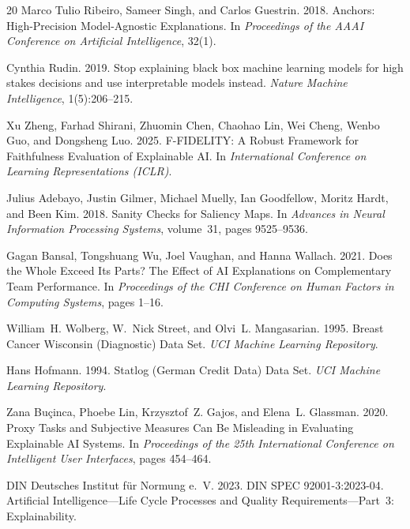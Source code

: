 \documentclass[twoside,11pt]{article}
\begin{document}
\begin{thebibliography}{20}
Marco Tulio Ribeiro, Sameer Singh, and Carlos Guestrin.
2018.
Anchors: High-Precision Model-Agnostic Explanations.
In \emph{Proceedings of the AAAI Conference on Artificial Intelligence}, 32(1).

Cynthia Rudin.
2019.
Stop explaining black box machine learning models for high stakes decisions and use interpretable models instead.
\emph{Nature Machine Intelligence}, 1(5):206--215.

Xu Zheng, Farhad Shirani, Zhuomin Chen, Chaohao Lin, Wei Cheng, Wenbo Guo, and Dongsheng Luo.
2025.
F-FIDELITY: A Robust Framework for Faithfulness Evaluation of Explainable AI.
In \emph{International Conference on Learning Representations (ICLR)}.

Julius Adebayo, Justin Gilmer, Michael Muelly, Ian Goodfellow, Moritz Hardt,
and Been Kim.
2018.
Sanity Checks for Saliency Maps.
In \emph{Advances in Neural Information Processing Systems}, volume~31,
pages 9525--9536.

Gagan Bansal, Tongshuang Wu, Joel Vaughan, and Hanna Wallach.
2021.
Does the Whole Exceed Its Parts? The Effect of {AI} Explanations on
Complementary Team Performance.
In \emph{Proceedings of the CHI Conference on Human Factors in Computing
Systems}, pages 1--16.

William~H. Wolberg, W.~Nick Street, and Olvi~L. Mangasarian.
1995.
Breast Cancer Wisconsin (Diagnostic) Data Set.
\emph{UCI Machine Learning Repository}.

Hans Hofmann.
1994.
Statlog (German Credit Data) Data Set.
\emph{UCI Machine Learning Repository}.

Zana Bu\c{c}inca, Phoebe Lin, Krzysztof~Z. Gajos, and Elena~L. Glassman.
2020.
Proxy Tasks and Subjective Measures Can Be Misleading in Evaluating Explainable
{AI} Systems.
In \emph{Proceedings of the 25th International Conference on Intelligent User
Interfaces}, pages 454--464.

{DIN Deutsches Institut f{\"u}r Normung e.~V.}
2023.
{DIN SPEC 92001-3:2023-04}. Artificial Intelligence---Life Cycle Processes and
Quality Requirements---Part~3: Explainability.


\end{thebibliography}
\end{document}
